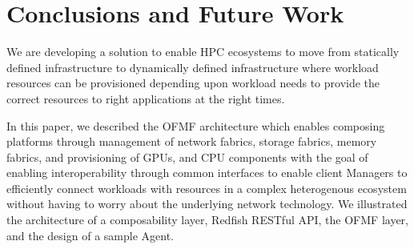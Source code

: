 \section{Conclusions and Future Work}


We are developing a solution to enable HPC ecosystems to move from statically defined infrastructure to dynamically defined infrastructure where workload resources can be provisioned depending upon workload needs to provide the correct resources to right applications at the right times.

In this paper, we described the OFMF architecture which enables composing platforms through management of network fabrics, storage fabrics, memory fabrics, and provisioning of GPUs, and CPU components with the goal of enabling interoperability through common interfaces to enable client Managers to efficiently connect workloads with resources in a complex heterogenous ecosystem without having to worry about the underlying network technology.  We illustrated the architecture of a composability layer, Redfish RESTful API, the OFMF layer, and the design of a sample Agent. 

